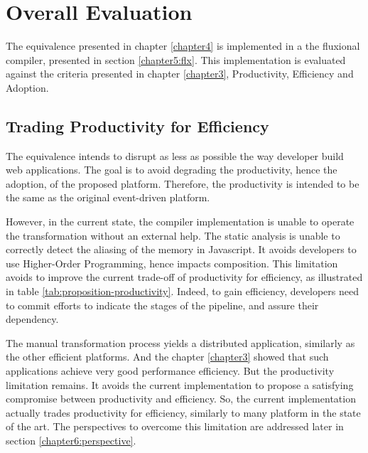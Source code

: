 \section{Overall Evaluation} \label{chapter6:evaluation}

The equivalence presented in chapter \ref{chapter4} is implemented in a the fluxional compiler, presented in section \ref{chapter5:flx}.
This implementation is evaluated against the criteria presented in chapter \ref{chapter3}, Productivity, Efficiency and Adoption.

\subsection{Trading Productivity for Efficiency}


The equivalence intends to disrupt as less as possible the way developer build web applications.
The goal is to avoid degrading the productivity, hence the adoption, of the proposed platform.
Therefore, the productivity is intended to be the same as the original event-driven platform.

However, in the current state, the compiler implementation is unable to operate the transformation without an external help.
The static analysis is unable to correctly detect the aliasing of the memory in Javascript.
It avoids developers to use Higher-Order Programming, hence impacts composition.
This limitation avoids to improve the current trade-off of productivity for efficiency, as illustrated in table \ref{tab:proposition-productivity}.
Indeed, to gain efficiency, developers need to commit efforts to indicate the stages of the pipeline, and assure their dependency.


The manual transformation process yields a distributed application, similarly as the other efficient platforms.
And the chapter \ref{chapter3} showed that such applications achieve very good performance efficiency.
But the productivity limitation remains.
It avoids the current implementation to propose a satisfying compromise between productivity and efficiency.
So, the current implementation actually trades productivity for efficiency, similarly to many platform in the state of the art. %
The perspectives to overcome this limitation are addressed later in section \ref{chapter6:perspective}.


